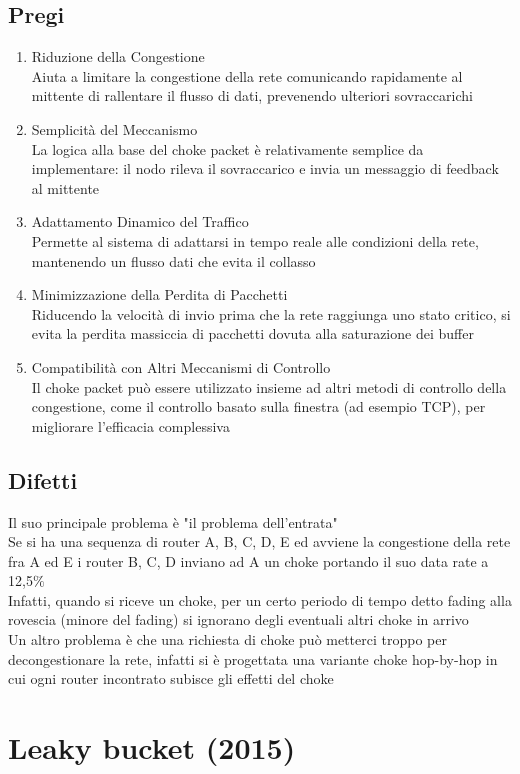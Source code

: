 \documentclass[10pt,oneside,a4paper]{article}
\begin{document}
\subsection{Pregi}
\begin{enumerate}
\item Riduzione della Congestione\\
Aiuta a limitare la congestione della rete comunicando rapidamente al mittente di rallentare il flusso di dati, prevenendo ulteriori sovraccarichi
\item Semplicità del Meccanismo\\
La logica alla base del choke packet è relativamente semplice da implementare: il nodo rileva il sovraccarico e invia un messaggio di feedback al mittente
\item Adattamento Dinamico del Traffico\\
Permette al sistema di adattarsi in tempo reale alle condizioni della rete, mantenendo un flusso dati che evita il collasso
\item Minimizzazione della Perdita di Pacchetti\\
Riducendo la velocità di invio prima che la rete raggiunga uno stato critico, si evita la perdita massiccia di pacchetti dovuta alla saturazione dei buffer
\item Compatibilità con Altri Meccanismi di Controllo\\
Il choke packet può essere utilizzato insieme ad altri metodi di controllo della congestione, come il controllo basato sulla finestra (ad esempio TCP), per migliorare l'efficacia complessiva
\end{enumerate}
\subsection{Difetti}
Il suo principale problema è "il problema dell'entrata"\\
Se si ha una sequenza di router A, B, C, D, E ed avviene la congestione della rete fra A ed E i router B, C, D inviano ad A un choke portando il suo data rate a 12,5$\%$\\
Infatti, quando si riceve un choke, per un certo periodo di tempo detto fading alla rovescia (minore del fading) si ignorano degli eventuali altri choke in arrivo\\
Un altro problema è che una richiesta di choke può metterci troppo per decongestionare la rete, infatti si è progettata una variante choke hop-by-hop in cui ogni router incontrato subisce gli effetti del choke
\section{Leaky bucket (2015)}
\end{document}
